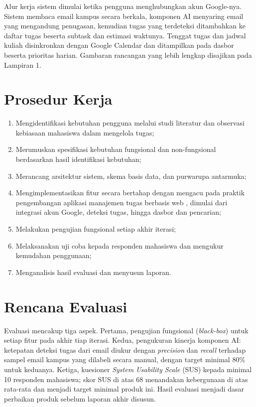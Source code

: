 Alur kerja sistem dimulai ketika pengguna menghubungkan akun Google-nya.
Sistem membaca email kampus secara berkala, komponen AI menyaring email
yang mengandung penugasan, kemudian tugas yang terdeteksi ditambahkan ke
daftar tugas beserta subtask dan estimasi waktunya. Tenggat tugas dan
jadwal kuliah disinkronkan dengan Google Calendar dan ditampilkan pada
dasbor beserta prioritas harian. Gambaran rancangan yang lebih lengkap
disajikan pada Lampiran 1.

\section{Prosedur Kerja}
\begin{enumerate}
  \item Mengidentifikasi kebutuhan pengguna melalui studi literatur dan
    observasi kebiasaan mahasiswa dalam mengelola tugas;
  \item Merumuskan spesifikasi kebutuhan fungsional dan non-fungsional
    berdasarkan hasil identifikasi kebutuhan;
  \item Merancang arsitektur sistem, skema basis data, dan purwarupa
    antarmuka;
  \item Mengimplementasikan fitur secara bertahap dengan mengacu pada
    praktik pengembangan aplikasi manajemen tugas berbasis web
    \parencite{panjaitan2025}, dimulai dari integrasi akun Google, deteksi
    tugas, hingga dasbor dan pencarian;
  \item Melakukan pengujian fungsional setiap akhir iterasi;
  \item Melaksanakan uji coba kepada responden mahasiswa dan mengukur
    kemudahan penggunaan;
  \item Menganalisis hasil evaluasi dan menyusun laporan.
\end{enumerate}

\section{Rencana Evaluasi}
Evaluasi mencakup tiga aspek. Pertama, pengujian fungsional
(\emph{black-box}) untuk setiap fitur pada akhir tiap iterasi. Kedua,
pengukuran kinerja komponen AI: ketepatan deteksi tugas dari email diukur
dengan \emph{precision} dan \emph{recall} terhadap sampel email kampus
yang dilabeli secara manual, dengan target minimal 80\% untuk keduanya.
Ketiga, kuesioner \emph{System Usability Scale} (SUS) \parencite{dyayu2023}
kepada minimal 10 responden mahasiswa; skor SUS di atas 68 menandakan
kebergunaan di atas rata-rata dan menjadi target minimal produk ini.
Hasil evaluasi menjadi dasar perbaikan produk sebelum laporan
akhir disusun.

